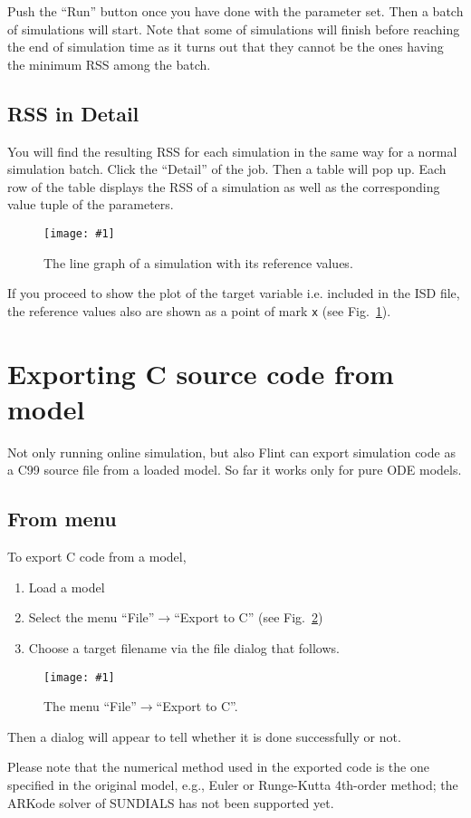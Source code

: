 \documentclass[a4paper,10pt]{report}
\newcommand\FigureOfImage[2]{\begin{figure}[h]
  \centering
  \texttt{[image: \#1]}
  \caption{#2}\label{fig:#1}
\end{figure}}
\begin{document}
Push the ``Run'' button once you have done with the parameter set. Then a batch
of simulations will start. Note that some of simulations will finish before
reaching the end of simulation time as it turns out that they cannot be the ones
having the minimum RSS among the batch.

\subsection{RSS in Detail}
You will find the resulting RSS for each simulation in the same way for a normal
simulation batch. Click the ``Detail'' of the job. Then a table will pop up.
Each row of the table displays the RSS of a simulation as well as the
corresponding value tuple of the parameters.

\FigureOfImage{parameter-fitting-plot}{The line graph of a simulation with its
  reference values.}

If you proceed to show the plot of the target variable i.e. included in the ISD
file, the reference values also are shown as a point of mark {\tt x} (see
Fig.~\ref{fig:parameter-fitting-plot}).

\section{Exporting C source code from model}
Not only running online simulation, but also Flint can export simulation code
as a C99 source file from a loaded model. So far it works only for pure ODE models.

\subsection{From menu}
To export C code from a model,
\begin{enumerate}
\item Load a model
\item Select the menu ``File''$\rightarrow$``Export to C'' (see Fig.~\ref{fig:export-to-c})
\item Choose a target filename via the file dialog that follows.
\end{enumerate}
\FigureOfImage{export-to-c}{The menu ``File''$\rightarrow$``Export to C''.}
Then a dialog will appear to tell whether it is done successfully or not.

Please note that the numerical method used in the exported code is the one
specified in the original model, e.g., Euler or Runge-Kutta 4th-order method;
the ARKode solver of SUNDIALS has not been supported yet.
\end{document}
